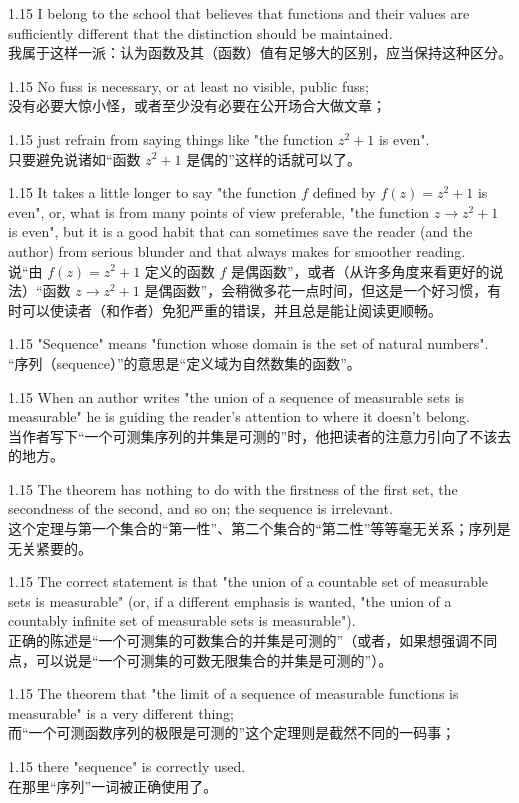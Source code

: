 \documentclass[12pt,a4paper]{article}
\newcommand{\bilingual}[2]{
    \begin{spacing}{1.15} %
        \noindent \normalsize #1 \\[-0.5ex] %
        \small \textcolor{blue!70!black}{#2} %
    \end{spacing}
    \vspace{0.8em} %
}
\begin{document}
\bilingual{I belong to the school that believes that functions and their values are sufficiently different that the distinction should be maintained.}
{我属于这样一派：认为函数及其（函数）值有足够大的区别，应当保持这种区分。} %

\bilingual{No fuss is necessary, or at least no visible, public fuss;}
{没有必要大惊小怪，或者至少没有必要在公开场合大做文章；} %

\bilingual{just refrain from saying things like "the function $z^{2}+1$ is even".}
{只要避免说诸如“函数 $z^{2}+1$ 是偶的”这样的话就可以了。} %

\bilingual{It takes a little longer to say "the function $f$ defined by $f(z)=z^{2}+1$ is even", or, what is from many points of view preferable, "the function $z\rightarrow z^{2}+1$ is even", but it is a good habit that can sometimes save the reader (and the author) from serious blunder and that always makes for smoother reading.}
{说“由 $f(z)=z^{2}+1$ 定义的函数 $f$ 是偶函数”，或者（从许多角度来看更好的说法）“函数 $z\rightarrow z^{2}+1$ 是偶函数”，会稍微多花一点时间，但这是一个好习惯，有时可以使读者（和作者）免犯严重的错误，并且总是能让阅读更顺畅。} %

\bilingual{"Sequence" means "function whose domain is the set of natural numbers".}
{“序列（sequence）”的意思是“定义域为自然数集的函数”。} %

\bilingual{When an author writes "the union of a sequence of measurable sets is measurable" he is guiding the reader's attention to where it doesn't belong.}
{当作者写下“一个可测集序列的并集是可测的”时，他把读者的注意力引向了不该去的地方。} %

\bilingual{The theorem has nothing to do with the firstness of the first set, the secondness of the second, and so on; the sequence is irrelevant.}
{这个定理与第一个集合的“第一性”、第二个集合的“第二性”等等毫无关系；序列是无关紧要的。} %

\bilingual{The correct statement is that "the union of a countable set of measurable sets is measurable" (or, if a different emphasis is wanted, "the union of a countably infinite set of measurable sets is measurable").}
{正确的陈述是“一个可测集的可数集合的并集是可测的”（或者，如果想强调不同点，可以说是“一个可测集的可数无限集合的并集是可测的”）。} %

\bilingual{The theorem that "the limit of a sequence of measurable functions is measurable" is a very different thing;}
{而“一个可测函数序列的极限是可测的”这个定理则是截然不同的一码事；} %

\bilingual{there "sequence" is correctly used.}
{在那里“序列”一词被正确使用了。} %
\end{document}
